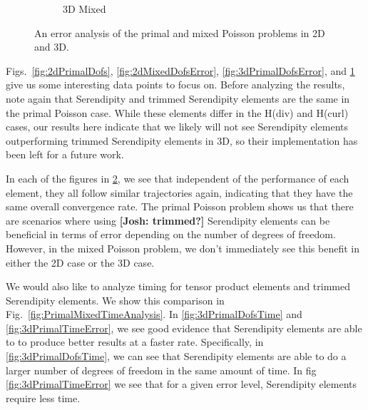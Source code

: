 \documentclass[manuscript,screen]{acmart}
\newcommand\josh[1]{\textbf{\textcolor[rgb]{0,.5,1}{[Josh: #1]}}}
\begin{document}
\begin{figure}[h!]
\begin{subfigure}[h]{0.5\textwidth}
    \caption{3D Mixed}
    \label{fig:3dMixedDofsError}
  \end{subfigure}
  \caption{An error analysis of the primal and mixed Poisson problems in 2D and 3D.}
\label{fig:PrimalMixedErrorAnalysis}
\end{figure}


Figs.~\ref{fig:2dPrimalDofs}, \ref{fig:2dMixedDofsError}, \ref{fig:3dPrimalDofsError}, and \ref{fig:3dMixedDofsError} give us some interesting data points to focus on.  Before analyzing the results, note again that Serendipity and trimmed Serendipity elements are the same in the primal Poisson case.  While these elements differ in the H(div) and H(curl) cases, our results here indicate that we likely will not see Serendipity elements outperforming trimmed Serendipity elements in 3D, so their implementation has been left for a future work.

In each of the figures in \ref{fig:PrimalMixedErrorAnalysis}, we see that independent of the performance of each element, they all follow similar trajectories again, indicating that they have the same overall convergence rate.  The primal Poisson problem shows us that there are scenarios where using \josh{trimmed?} Serendipity elements can be beneficial in terms of error depending on the number of degrees of freedom.  However, in the mixed Poisson problem, we don't immediately see this benefit in either the 2D case or the 3D case.

We would also like to analyze timing for tensor product elements and trimmed Serendipity elements.  We show this comparison in Fig.~\ref{fig:PrimalMixedTimeAnalysis}.  In \ref{fig:3dPrimalDofsTime} and \ref{fig:3dPrimalTimeError}, we see good evidence that Serendipity elements are able to to produce better results at a faster rate.  Specifically, in \ref{fig:3dPrimalDofsTime}, we can see that Serendipity elements are able to do a larger number of degrees of freedom in the same amount of time.  In fig \ref{fig:3dPrimalTimeError} we see that for a given error level, Serendipity elements require less time.
\end{document}
